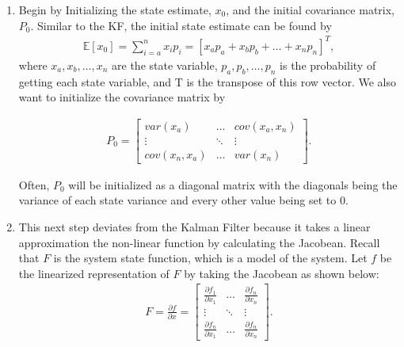 \begin{enumerate}
  \item Begin by Initializing the state estimate, $x_0$, and the initial covariance matrix, $P_0$. Similar to the KF, the initial state estimate can be found by 
  \begin{align*}
           \mathbb{E}[x_0]   = \sum^n_{i = a} x_i p_i = [x_a p_a + x_b p_b + \hdots + x_n p_n]^T,
      \end{align*}
 \noindent where  $x_a, x_b, \hdots, x_n$ are the state variable, $p_a, p_b, \hdots, p_n$ is the probability of getting each state variable, and T is the transpose of this row vector. We also want to initialize the covariance matrix by

    
  \begin{align*}
      P_0 =
      \begin{bmatrix}
           var(x_a)  & \hdots & cov(x_a,x_n) \\
           \vdots & \ddots & \vdots \\
           cov(x_n, x_a)  & \hdots & var(x_n )
         \end{bmatrix} .
  \end{align*}  
  
  Often, $P_0 $ will be initialized as a diagonal matrix with the diagonals being the variance of each state variance and every other value being set to 0.
  
  
  \item This next step deviates from the Kalman Filter because it takes a linear approximation the non-linear function by calculating the Jacobean. Recall that $F$ is the system state function, which is a model of the system. Let $f$ be the linearized representation of $F$ by taking the Jacobean as shown below:
  \begin{align*}
      F= \frac{\partial f}{\partial x} =
      \begin{bmatrix}
           \frac{\partial f_1}{\partial x_1} & \hdots & \frac{\partial f_n}{\partial x_n} \\
           \vdots & \ddots & \vdots \\
           \frac{\partial f_n}{\partial x_1}  & \hdots & \frac{\partial f_n}{\partial x_n}
         \end{bmatrix}  .
  \end{align*}
  

\end{enumerate}

